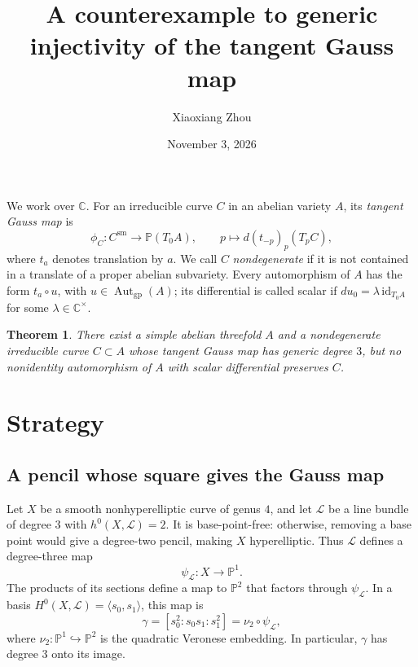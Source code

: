 \documentclass[11pt]{amsart}
\title[The tangent Gauss map]{A counterexample to generic injectivity of the tangent Gauss map}
\author{Xiaoxiang Zhou}
\date{November 3, 2026}
\newtheorem{theorem}{Theorem}
\theoremstyle{remark}
\DeclareMathOperator{\Aut}{Aut}
\newcommand{\CC}{\mathbb C}
\newcommand{\PP}{\mathbb P}
\newcommand{\LL}{\mathcal L}
\numberwithin{equation}{section}
\begin{document}
\maketitle

We work over $\CC$. For an irreducible curve $C$ in an abelian variety $A$,
its \emph{tangent Gauss map} is
\[
\phi_C:C^{\mathrm{sm}}\longrightarrow\PP(T_0A),\qquad
p\longmapsto d(t_{-p})_p(T_pC),
\]
where $t_a$ denotes translation by $a$. We call $C$ \emph{nondegenerate}
if it is not contained in a translate of a proper abelian subvariety.
Every automorphism of $A$ has the form $t_a\circ u$, with
$u\in\Aut_{\mathrm{gp}}(A)$; its differential is called scalar if
$du_0=\lambda\,\mathrm{id}_{T_0A}$ for some $\lambda\in\CC^\times$.

\begin{theorem}\label{thm:main}
There exist a simple abelian threefold $A$ and a nondegenerate irreducible
curve $C\subset A$ whose tangent Gauss map has generic degree $3$, but no
nonidentity automorphism of $A$ with scalar differential preserves $C$.
\end{theorem}

\section{Strategy}

\subsection{A pencil whose square gives the Gauss map}
Let $X$ be a smooth nonhyperelliptic curve of genus $4$, and let $\LL$ be
a line bundle of degree $3$ with $h^0(X,\LL)=2$. It is base-point-free:
otherwise, removing a base point would give a degree-two pencil, making
$X$ hyperelliptic. Thus $\LL$ defines a degree-three map
\[
\psi_{\LL}:X\longrightarrow\PP^1.
\]
The products of its sections define a map to $\PP^2$ that factors through
$\psi_{\LL}$. In a basis $H^0(X,\LL)=\langle s_0,s_1\rangle$, this map is
\begin{equation}\label{eq:veronese}
\gamma=[s_0^2:s_0s_1:s_1^2]=\nu_2\circ\psi_{\LL},
\end{equation}
where $\nu_2:\PP^1\hookrightarrow\PP^2$ is the quadratic Veronese
embedding. In particular, $\gamma$ has degree $3$ onto its image.
\end{document}
